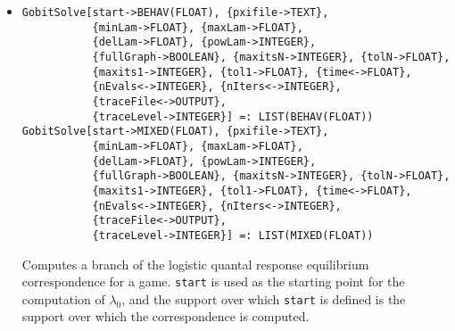\begin{itemize}
\item{}
\protect \large \begin{verbatim}
GobitSolve[start->BEHAV(FLOAT), {pxifile->TEXT},
           {minLam->FLOAT}, {maxLam->FLOAT},
           {delLam->FLOAT}, {powLam->INTEGER},
           {fullGraph->BOOLEAN}, {maxitsN->INTEGER}, {tolN->FLOAT},
           {maxits1->INTEGER}, {tol1->FLOAT}, {time<->FLOAT},
           {nEvals<->INTEGER}, {nIters<->INTEGER},
           {traceFile<->OUTPUT},
           {traceLevel->INTEGER}] =: LIST(BEHAV(FLOAT))
GobitSolve[start->MIXED(FLOAT), {pxifile->TEXT},
           {minLam->FLOAT}, {maxLam->FLOAT},
           {delLam->FLOAT}, {powLam->INTEGER},
           {fullGraph->BOOLEAN}, {maxitsN->INTEGER}, {tolN->FLOAT},
           {maxits1->INTEGER}, {tol1->FLOAT}, {time<->FLOAT},
           {nEvals<->INTEGER}, {nIters<->INTEGER},
           {traceFile<->OUTPUT},
           {traceLevel->INTEGER}] =: LIST(MIXED(FLOAT))
\end{verbatim}\normalsize

\bd 
Computes a branch of the logistic quantal response equilibrium
correspondence for a game. \verb+start+ is
used as the starting point for the computation of $\lambda_{0}$, and
the support over which \verb+start+ is defined is the support over
which the correspondence is computed.


\end{itemize}
